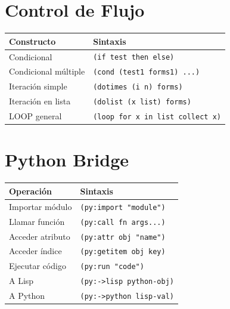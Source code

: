 \section*{Control de Flujo}

\begin{center}
\begin{tabular}{ll}
\toprule
\textbf{Constructo} & \textbf{Sintaxis} \\
\midrule
Condicional & \texttt{(if test then else)} \\
Condicional múltiple & \texttt{(cond (test1 forms1) ...)} \\
Iteración simple & \texttt{(dotimes (i n) forms)} \\
Iteración en lista & \texttt{(dolist (x list) forms)} \\
LOOP general & \texttt{(loop for x in list collect x)} \\
\bottomrule
\end{tabular}
\end{center}

\section*{Python Bridge}

\begin{center}
\begin{tabular}{ll}
\toprule
\textbf{Operación} & \textbf{Sintaxis} \\
\midrule
Importar módulo & \texttt{(py:import "module")} \\
Llamar función & \texttt{(py:call fn args...)} \\
Acceder atributo & \texttt{(py:attr obj "name")} \\
Acceder índice & \texttt{(py:getitem obj key)} \\
Ejecutar código & \texttt{(py:run "code")} \\
A Lisp & \texttt{(py:->lisp python-obj)} \\
A Python & \texttt{(py:->python lisp-val)} \\
\bottomrule
\end{tabular}
\end{center}


